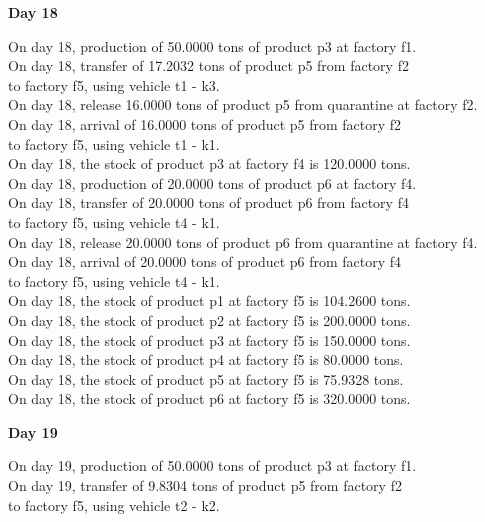 \begin{table}[H]
\begin{multicols}{2}
\textbf{Day 18}
\vspace{-1.6em}
\begin{tabbing}
On day 18, production of 50.0000 tons of product p3 at factory f1. \\
On day 18, transfer of 17.2032 tons of product p5 from factory f2 \\ to factory f5, using vehicle t1 - k3. \\
On day 18, release 16.0000 tons of product p5 from quarantine at factory f2. \\
On day 18, arrival of 16.0000 tons of product p5 from factory f2 \\ to factory f5, using vehicle t1 - k1. \\
On day 18, the stock of product p3 at factory f4 is 120.0000 tons. \\
On day 18, production of 20.0000 tons of product p6 at factory f4. \\
On day 18, transfer of 20.0000 tons of product p6 from factory f4 \\ to factory f5, using vehicle t4 - k1. \\
On day 18, release 20.0000 tons of product p6 from quarantine at factory f4. \\
On day 18, arrival of 20.0000 tons of product p6 from factory f4 \\ to factory f5, using vehicle t4 - k1. \\
On day 18, the stock of product p1 at factory f5 is 104.2600 tons. \\
On day 18, the stock of product p2 at factory f5 is 200.0000 tons. \\
On day 18, the stock of product p3 at factory f5 is 150.0000 tons. \\
On day 18, the stock of product p4 at factory f5 is 80.0000 tons. \\
On day 18, the stock of product p5 at factory f5 is 75.9328 tons. \\
On day 18, the stock of product p6 at factory f5 is 320.0000 tons. \\
\end{tabbing} \vspace{-2.0em}
\textbf{Day 19}
\vspace{-1.6em}
\begin{tabbing}
On day 19, production of 50.0000 tons of product p3 at factory f1. \\
On day 19, transfer of 9.8304 tons of product p5 from factory f2 \\ to factory f5, using vehicle t2 - k2. \\

\end{tabbing}
\end{multicols}
\end{table}
